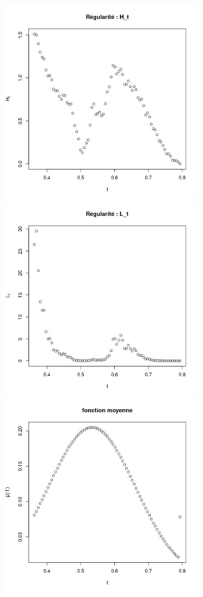 \begin{figure}[H]
	\centering
	\begin{minipage}{0.48\textwidth}
	\includegraphics[width=0.75\textwidth]{Images/pv_estim/hiv_187128_Ht.jpg}
	\includegraphics[width=0.75\textwidth]{Images/pv_estim/hiv_187128_Lt.jpg}
	\includegraphics[width=0.75\textwidth]{Images/pv_estim/hiv_187128_mut.jpg}

\end{minipage}
\end{figure}
